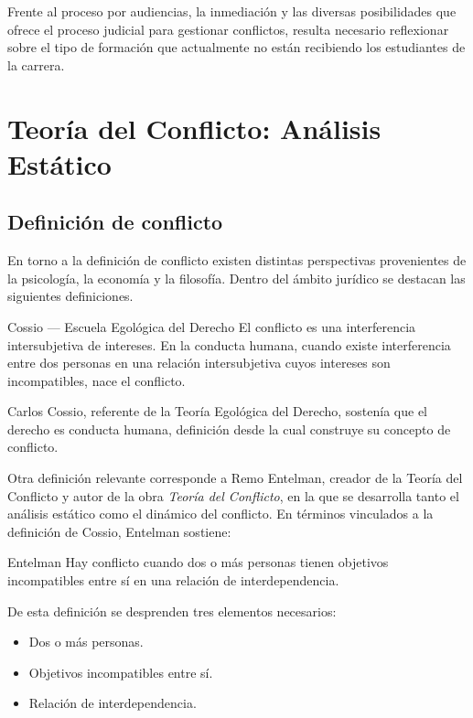 \documentclass[12pt,oneside]{book}
\begin{document}
Frente al proceso por audiencias, la inmediación y las diversas posibilidades que ofrece el proceso judicial para gestionar conflictos, resulta necesario reflexionar sobre el tipo de formación que actualmente no están recibiendo los estudiantes de la carrera.

\chapter{Teoría del Conflicto: Análisis Estático}

\section{Definición de conflicto}

En torno a la definición de conflicto existen distintas perspectivas provenientes de la psicología, la economía y la filosofía. Dentro del ámbito jurídico se destacan las siguientes definiciones.

\begin{definition}{Cossio --- Escuela Egológica del Derecho}
El conflicto es una interferencia intersubjetiva de intereses. En la conducta humana, cuando existe interferencia entre dos personas en una relación intersubjetiva cuyos intereses son incompatibles, nace el conflicto.
\end{definition}

Carlos Cossio, referente de la Teoría Egológica del Derecho, sostenía que el derecho es conducta humana, definición desde la cual construye su concepto de conflicto.

Otra definición relevante corresponde a Remo Entelman, creador de la Teoría del Conflicto y autor de la obra \textit{Teoría del Conflicto}, en la que se desarrolla tanto el análisis estático como el dinámico del conflicto. En términos vinculados a la definición de Cossio, Entelman sostiene:

\begin{definition}{Entelman}
Hay conflicto cuando dos o más personas tienen objetivos incompatibles entre sí en una relación de interdependencia.
\end{definition}

De esta definición se desprenden tres elementos necesarios:
\begin{itemize}
    \item Dos o más personas.
    \item Objetivos incompatibles entre sí.
    \item Relación de interdependencia.
\end{itemize}
\end{document}
